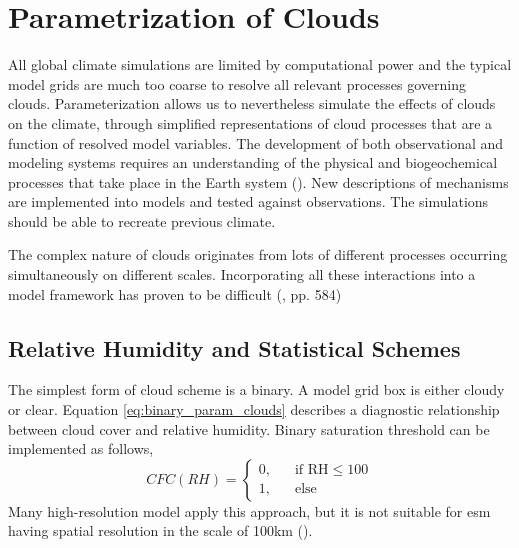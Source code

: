 \section{Parametrization of Clouds} \label{sec:param_clouds}
All global climate simulations are limited by computational power and the typical model grids are much too coarse to resolve all relevant processes governing clouds. Parameterization allows us to nevertheless simulate the effects of clouds on the climate, through simplified representations of cloud processes that are a function of resolved model variables. The development of both observational and modeling systems requires an understanding of the physical and biogeochemical processes that take place in the Earth system (\cite{Simmons2016Observation2016-2025}). New descriptions of mechanisms are implemented into models and tested against observations. The simulations should be able to recreate previous climate. 

The complex nature of clouds originates from lots of different processes occurring simultaneously on different scales. Incorporating all these interactions into a model framework has proven to be difficult (\cite{IPCC_CH7_clouds}, pp. 584)

\subsection{Relative Humidity and Statistical Schemes}
The simplest form of cloud scheme is a binary. A model grid box is either cloudy or clear. Equation \eqref{eq:binary_param_clouds} describes a diagnostic relationship between cloud cover and relative humidity. Binary saturation threshold can be implemented as follows,
\begin{equation} \label{eq:binary_param_clouds}
    CFC\left(RH\right) = 
     \begin{cases}
       \text{0,} &\quad\text{if RH}\le100\\
       \text{1,} &\quad\text{else}
     \end{cases}
\end{equation}
Many high-resolution model apply this approach, but it is not suitable for \acrshort{esm} having spatial resolution in the scale of 100km (\cite{Tomkins2005}).

